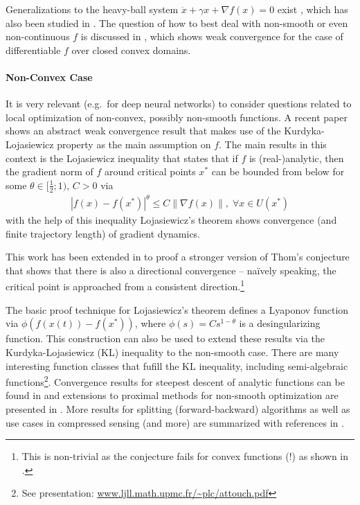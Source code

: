\documentclass{article}
\begin{document}
Generalizations to the heavy-ball system $\ddot x + \gamma x + \nabla f(x) = 0$ exist \cite{alvarez2000minimizing}, which has also been studied in \cite{antipin1994minimization,haraux1998convergence}. The question of how to best deal with non-smooth or even non-continuous $f$ is discussed in \cite{attouch2000heavy}, which shows weak convergence for the case of differentiable $f$ over closed convex domains. 

\paragraph{Non-Convex Case} It is very relevant (e.g.~for deep neural networks) to consider questions related to local optimization of non-convex, possibly non-smooth functions. A recent paper \cite{attouch2013convergence} shows an abstract weak convergence result that makes use of the Kurdyka-Lojasiewicz property as the main assumption on $f$. The main results in this context is the Lojasiewicz inequality that states that if $f$ is (real-)analytic, then the gradient norm of $f$ around critical points $x^*$ can be bounded from below for some $\theta \in [\tfrac 12; 1)$, $C>0$ via
\begin{align}
| f(x) - f(x^*) |^\theta \le C \| \nabla f(x) \|, \; \forall x \in U(x^*)
\end{align}
with the help of this inequality Lojasiewicz's theorem \cite{Lojasiewicz84} shows convergence (and finite trajectory length) of gradient dynamics. 

This work has been extended in \cite{kurdyka2000proof} 
to proof a stronger version of Thom's conjecture that shows that there is also a directional convergence -- na\"ively speaking, the critical point is approached from a consistent direction.\footnote{This is non-trivial as the conjecture fails for convex functions (!) as shown in \cite{daniilidis2010asymptotic}.} 

The basic proof technique for Lojasiewicz's theorem defines a Lyaponov function via $\phi(f(x(t))-f(x^*))$, where $\phi(s) = Cs^{1-\theta}$ is a desingularizing function. This construction can also be used \cite{kurdyka1998gradients} to extend these results via the Kurdyka-Lojasiewicz (KL) inequality \cite{attouch2010proximal} to the non-smooth case. There are many interesting function classes that fufill the KL inequality, including semi-algebraic functions\footnote{See presentation: \url{www.ljll.math.upmc.fr/~plc/attouch.pdf}}. Convergence results for steepest descent of analytic functions can be found in \cite{absil2005convergence} and extensions to proximal methods for non-smooth optimization are presented in \cite{attouch2009convergence,attouch2011prox}. More results for splitting (forward-backward) algorithms as well as use cases in compressed sensing (and more) are summarized with references in \cite{attouch2011Poincare}.
\end{document}
